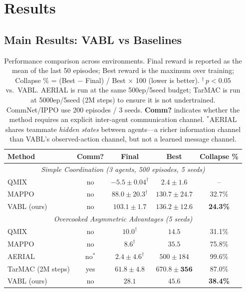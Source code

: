 \documentclass{article}
\theoremstyle{plain}
\theoremstyle{definition}
\theoremstyle{remark}
\begin{document}
\section{Results}
\label{sec:results}

\subsection{Main Results: VABL vs Baselines}

\begin{table}[tb]
\centering
\caption{Performance comparison across environments. Final reward is reported as the mean of the last 50 episodes; Best reward is the maximum over training; Collapse \% = (Best $-$ Final) / Best $\times$ 100 (lower is better). $^\dagger$\,$p < 0.05$ vs.\ VABL. AERIAL is run at the same 500ep/5seed budget; TarMAC is run at 5000ep/5seed (2M steps) to ensure it is not undertrained. CommNet/IPPO use 200 episodes / 3 seeds. \textbf{Comm?} indicates whether the method requires an explicit inter-agent communication channel. $^\ast$AERIAL shares teammate \emph{hidden states} between agents---a richer information channel than VABL's observed-action channel, but not a learned message channel.}
\label{tab:main_results}
\begingroup
\setlength{\tabcolsep}{6pt}
\renewcommand{\arraystretch}{1.0}
\small
\begin{tabular}{lcccc}
\toprule
\textbf{Method} & \textbf{Comm?} & \textbf{Final} & \textbf{Best} & \textbf{Collapse \%} \\
\midrule
\multicolumn{5}{c}{\textit{Simple Coordination (3 agents, 500 episodes, 5 seeds)}} \\
\midrule
QMIX & no & $-5.5 \pm 0.04^\dagger$ & $2.4 \pm 1.6$ & -- \\
MAPPO & no & $88.0 \pm 20.3^\dagger$ & $130.7 \pm 24.7$ & 32.7\% \\
VABL (ours) & no & $\mathbf{103.1 \pm 1.7}$ & $\mathbf{136.2 \pm 12.6}$ & \textbf{24.3\%} \\
\midrule
\multicolumn{5}{c}{\textit{Overcooked Asymmetric Advantages (5 seeds)}} \\
\midrule
QMIX & no & $10.0^\dagger$ & $14.5$ & 31.1\% \\
MAPPO & no & $8.6^\dagger$ & $35.5$ & 75.8\% \\
AERIAL & no$^\ast$ & $2.4 \pm 4.6^\dagger$ & $500 \pm 184$ & 99.6\% \\
TarMAC (2M steps) & yes & $61.8 \pm 4.8$ & $\mathbf{670.8 \pm 356}$ & 87.0\% \\
VABL (ours) & no & $28.1$ & $45.6$ & \textbf{38.4\%} \\

\end{tabular}
\end{table}
\end{document}
